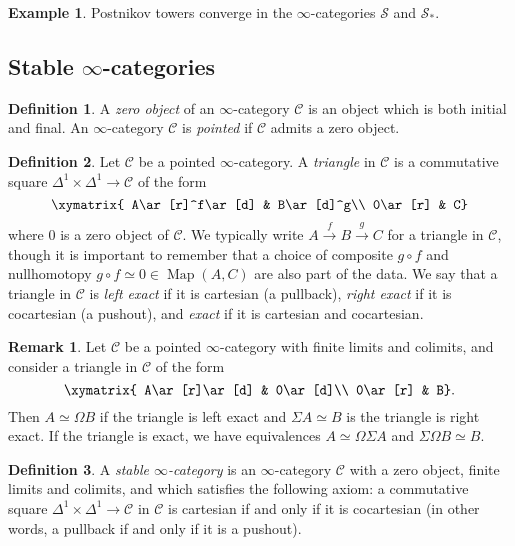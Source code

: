 \documentclass[12pt]{article}
\theoremstyle{definition}
\newtheorem{definition}{Definition}[subsection]
\newtheorem{example}{Example}[subsection]
\newtheorem{remark}{Remark}[subsection]
\newcommand{\C}{\mathcal{C}}
\renewcommand{\S}{\mathcal{S}}
\renewcommand{\i}{\infty}
\DeclareMathOperator{\Map}{Map}
\begin{document}
\begin{example}
Postnikov towers converge in the  $\infty$-categories $\S$ and $\S_*$.
\end{example}




\subsection{Stable $\infty$-categories}


\begin{definition}
A {\em zero object} of an $\infty$-category $\C$ is an object which is both initial and final.
An $\infty$-category $\C$ is {\em pointed}\index{pointed $\i$-category} if $\C$ admits a zero object.
\end{definition} 
\begin{definition}
Let $\C$ be a pointed $\i$-category.
A {\em triangle} in $\C$ is a commutative square $\Delta^1\times\Delta^1\to\C$ of the form
\[
\xymatrix{
A\ar[r]^f\ar[d] & B\ar[d]^g\\
0\ar[r] & C}
\]
where $0$ is a zero object of $\C$.
We typically write $A\overset{f}{\to}B\overset{g}{\to}C$ for a triangle in $\C$, though it is important to remember that a choice of composite $g\circ f$ and nullhomotopy $g\circ f\simeq 0\in\Map(A,C)$ are also part of the data.
We say that a triangle in $\C$ is {\em left exact} if it is cartesian (a pullback), {\em right exact} if it is cocartesian (a pushout), and {\em exact} if it is cartesian and cocartesian.
\end{definition}
\begin{remark}
Let $\C$ be a pointed $\i$-category with finite limits and colimits, and consider a triangle in $\C$ of the form
\[
\xymatrix{
A\ar[r]\ar[d] & 0\ar[d]\\
0\ar[r] & B}.
\]
Then $A\simeq\Omega B$ if the triangle is left exact and $\Sigma A\simeq B$ is the triangle is right exact.
If the triangle is exact, we have equivalences $A\simeq\Omega\Sigma A$ and $\Sigma\Omega B\simeq B$.
\end{remark}
\begin{definition}
A {\em stable $\infty$-category} is an $\infty$-category $\C$ with a zero object, finite limits and colimits, and which satisfies the following axiom: a commutative square $\Delta^1\times\Delta^1\to\C$ in $\C$ is cartesian if and only if it is cocartesian (in other words, a pullback if and only if it is a pushout).
\end{definition}
\end{document}
